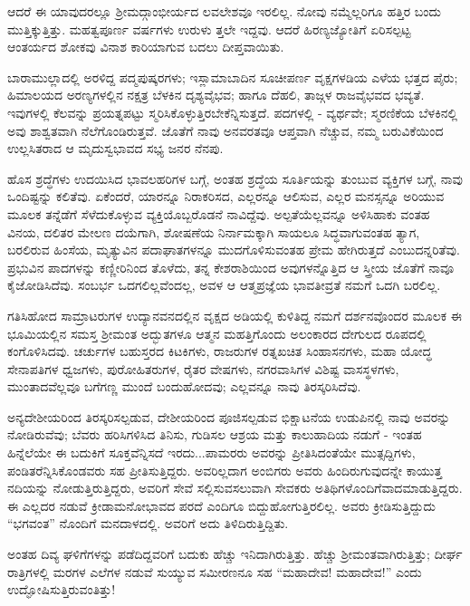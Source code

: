 ಆದರೆ ಈ ಯಾವುದರಲ್ಲೂ ಶ‍್ರೀಮದ್ಗಾಂಭೀರ್ಯದ ಲವಲೇಶವೂ ಇರಲಿಲ್ಲ. ನೋವು ನಮ್ಮೆಲ್ಲರಿಗೂ ಹತ್ತಿರ ಬಂದು ಮುತ್ತಿಕ್ಕುತ್ತಿತ್ತು. ಮಹತ್ವಪೂರ್ಣ ವರ್ಷಗಳು ಉರುಳು ತ್ತಲೇ ಇದ್ದವು. ಆದರೆ ಹಿರಣ್ಯಜ್ಯೋತಿಗೆ ಏರಿಸಲ್ಪಟ್ಟ ಆಂತರ್ಯದ ಶೋಕವು ವಿನಾಶ ಕಾರಿಯಾಗುವ ಬದಲು ದೀಪ್ತವಾಯಿತು.

ಬಾರಾಮುಲ್ಲಾದಲ್ಲಿ ಅರಳಿದ್ದ ಪದ್ಮಪುಷ್ಕರಗಳು; ಇಸ್ಲಾಮಾಬಾದಿನ ಸೂಚೀಪರ್ಣ ವೃಕ್ಷಗಳಡಿಯ ಎಳೆಯ ಭತ್ತದ ಪೈರು; ಹಿಮಾಲಯದ ಅರಣ್ಯಗಳಲ್ಲಿನ ನಕ್ಷತ್ರ ಬೆಳಕಿನ ದೃಶ್ಯವೈಭವ; ಹಾಗೂ ದೆಹಲಿ, ತಾಜ್ಗಳ ರಾಜವೈಭವದ ಭವ್ಯತೆ. ಇವುಗಳಲ್ಲಿ ಕೆಲವನ್ನು ಪ್ರಯತ್ನಪಟ್ಟು ಸ್ಮರಿಸಿಕೊಳ್ಳುತ್ತಿರಬೇಕೆನ್ನಿಸುತ್ತದೆ. ಪದಗಳಲ್ಲಿ - ವ್ಯರ್ಥವೇ; ಸ್ಮರಣಿಕೆಯ ಬೆಳಕಿನಲ್ಲಿ ಅವು ಶಾಶ್ವತವಾಗಿ ನೆಲೆಗೊಂಡಿರುತ್ತವೆ. ಜೊತೆಗೆ ನಾವು ಅನವರತವೂ ಆಪ್ತವಾಗಿ ನೆಚ್ಚುವ, ನಮ್ಮ ಬರುವಿಕೆಯಿಂದ ಉಲ್ಲಸಿತರಾದ ಆ ಮೃದುಸ್ವಭಾವದ ಸಭ್ಯ ಜನರ ನೆನಪು.

ಹೊಸ ಶ್ರದ್ಧೆಗಳು ಉದಯಿಸಿದ ಭಾವಲಹರಿಗಳ ಬಗ್ಗೆ, ಅಂತಹ ಶ್ರದ್ಧೆಯ ಸೂರ್ತಿಯನ್ನು ತುಂಬುವ ವ್ಯಕ್ತಿಗಳ ಬಗ್ಗೆ, ನಾವು ಒಂದಿಷ್ಟನ್ನು ಕಲಿತೆವು. ಏಕೆಂದರೆ, ಯಾರನ್ನೂ ನಿರಾಕರಿಸದ, ಎಲ್ಲರನ್ನೂ ಆಲಿಸುವ, ಎಲ್ಲರ ಮನಸ್ಸನ್ನೂ ಅರಿಯುವ ಮೂಲಕ ತನ್ನೆಡೆಗೆ ಸೆಳೆದುಕೊಳ್ಳುವ ವ್ಯಕ್ತಿಯೊಬ್ಬರೊಡನೆ ನಾವಿದ್ದೆವು. ಅಲ್ಪತೆಯೆಲ್ಲವನ್ನೂ ಅಳಿಸಿಹಾಕು ವಂತಹ ವಿನಯ, ದಲಿತರ ಮೇಲಣ ದಯೆಗಾಗಿ, ಶೋಷಣೆಯ ನಿರ್ನಾಮಕ್ಕಾಗಿ ಸಾಯಲೂ ಸಿದ್ಧವಾಗುವಂತಹ ತ್ಯಾಗ, ಬರಲಿರುವ ಹಿಂಸೆಯ, ಮೃತ್ಯುವಿನ ಪದಾಘಾತಗಳನ್ನೂ ಮುದಗೊಳಿಸುವಂತಹ ಪ್ರೇಮ ಹೇಗಿರುತ್ತದೆ ಎಂಬುದನ್ನರಿತೆವು. ಪ್ರಭುವಿನ ಪಾದಗಳನ್ನು ಕಣ್ಣೀರಿನಿಂದ ತೊಳೆದು, ತನ್ನ ಕೇಶರಾಶಿಯಿಂದ ಅವುಗಳನ್ನೊತ್ತಿದ ಆ ಸ್ತ್ರೀಯ ಜೊತೆಗೆ ನಾವೂ ಕೈಜೋಡಿಸಿದೆವು. ಸಂಬರ್ಭ ಒದಗಲಿಲ್ಲವೆಂದಲ್ಲ, ಅವಳ ಆ ಆತ್ಮಪ್ರಜ್ಞೆಯ ಭಾವತೀವ್ರತೆ ನಮಗೆ ಒದಗಿ ಬರಲಿಲ್ಲ.

ಗತಿಸಿಹೋದ ಸಾಮ್ರಾಟರುಗಳ ಉದ್ಯಾನವನದಲ್ಲಿನ ವೃಕ್ಷದ ಅಡಿಯಲ್ಲಿ ಕುಳಿತಿದ್ದ ನಮಗೆ ದರ್ಶನವೊಂದರ ಮೂಲಕ ಈ ಭೂಮಿಯಲ್ಲಿನ ಸಮಸ್ತ ಶ‍್ರೀಮಂತ ಅದ್ಭುತಗಳೂ ಆತ್ಮನ ಮಹತ್ತಿಗೊಂದು ಅಲಂಕಾರದ ದೇಗುಲದ ರೂಪದಲ್ಲಿ ಕಂಗೊಳಿಸಿದವು. ಚರ್ಚುಗಳ ಬಹುಸ್ತರದ ಕಿಟಕಿಗಳು, ರಾಜರುಗಳ ರತ್ನಖಚಿತ ಸಿಂಹಾಸನಗಳು, ಮಹಾ ಯೋದ್ಧ ಸೇನಾಪತಿಗಳ ಧ್ವಜಗಳು, ಪುರೋಹಿತರುಗಳ, ರೈತರ ವೇಷಗಳು, ನಗರವಾಸಿಗಳ ವಿಶಿಷ್ಟ ವಾಸಸ್ಥಳಗಳು, ಮುಂತಾದವೆಲ್ಲವೂ ಬಗೆಗಣ್ಣ ಮುಂದೆ ಬಂದುಹೋದವು; ಎಲ್ಲವನ್ನೂ ನಾವು ತಿರಸ್ಕರಿಸಿದೆವು.

ಅನ್ಯದೇಶೀಯರಿಂದ ತಿರಸ್ಕರಿಸಲ್ಪಡುವ, ದೇಶೀಯರಿಂದ ಪೂಜಿಸಲ್ಪಡುವ ಭಿಕ್ಷಾಟನೆಯ ಉಡುಪಿನಲ್ಲಿ ನಾವು ಅವರನ್ನು ನೋಡಿರುವೆವು; ಬೆವರು ಹರಿಸಿಗಳಿಸಿದ ತಿನಿಸು, ಗುಡಿಸಲ ಆಶ್ರಯ ಮತ್ತು ಕಾಲುಹಾದಿಯ ನಡುಗೆ - ಇಂತಹ ಹಿನ್ನೆಲೆಯೇ ಈ ಬದುಕಿಗೆ ಸೂಕ್ತವೆನ್ನಿಸದೆ ಇರದು...ಪಾಮರರು ಅವರನ್ನು ಪ್ರೀತಿಸಿದಂತೆಯೇ ಮುತ್ಸದ್ದಿಗಳು, ಪಂಡಿತರೆನ್ನಿಸಿಕೊಂಡವರು ಸಹ ಪ್ರೀತಿಸುತ್ತಿದ್ದರು. ಅವರಿಲ್ಲದಾಗ ಅಂಬಿಗರು ಅವರು ಹಿಂದಿರುಗುವುದನ್ನೇ ಕಾಯುತ್ತ ನದಿಯನ್ನು ನೋಡುತ್ತಿರುತ್ತಿದ್ದರು, ಅವರಿಗೆ ಸೇವೆ ಸಲ್ಲಿಸುವಸಲುವಾಗಿ ಸೇವಕರು ಅತಿಥಿಗಳೊಂದಿಗೆವಾದಮಾಡುತ್ತಿದ್ದರು. ಈ ಎಲ್ಲದರ ನಡುವೆ ಕ್ರೀಡಾಮನೋಭಾವದ ಪರದೆ ಎಂದಿಗೂ ಬಿದ್ದುಹೋಗುತ್ತಿರಲಿಲ್ಲ. ಅವರು ಕ್ರೀಡಿಸುತ್ತಿದ್ದುದು “ಭಗವಂತ” ನೊಂದಿಗೆ ಮನದಾಳದಲ್ಲಿ. ಅವರಿಗೆ ಅದು ತಿಳಿದಿರುತ್ತಿದ್ದಿತು.

ಅಂತಹ ದಿವ್ಯ ಘಳಿಗೆಗಳನ್ನು ಪಡೆದಿದ್ದವರಿಗೆ ಬದುಕು ಹೆಚ್ಚು ಇನಿದಾಗಿರುತ್ತಿತ್ತು. ಹೆಚ್ಚು ಶ‍್ರೀಮಂತವಾಗಿರುತ್ತಿತ್ತು; ದೀರ್ಘ ರಾತ್ರಿಗಳಲ್ಲಿ ಮರಗಳ ಎಲೆಗಳ ನಡುವೆ ಸುಯ್ಯುವ ಸಮೀರಣನೂ ಸಹ “ಮಹಾದೇವ! ಮಹಾದೇವ!” ಎಂದು ಉದ್ಘೋಷಿಸುತ್ತಿರುವಂತಿತ್ತು!

